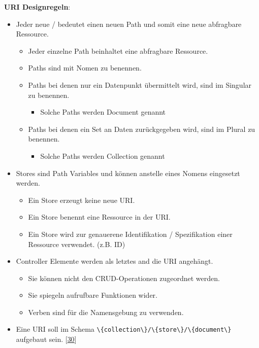 \documentclass[
    headings=optiontotocandhead,%
    twoside,
    numbers=noenddot,%
    12pt, %
    titlepage, %
    parskip=full, %
    listof=leveldown, 
    numbers=noenddot, %
    a4paper,DIV=14,
    BCOR=15mm,
]{scrbook}
\newcommand{\passthrough}[1]{#1}
\providecommand{\tightlist}{%
  \setlength{\itemsep}{0pt}\setlength{\parskip}{0pt}}
\begin{document}
\textbf{URI Designregeln}:

\begin{itemize}
\tightlist
\item
  Jeder neue / bedeutet einen neuen Path und somit eine neue abfragbare
  Ressource.

  \begin{itemize}
  \tightlist
  \item
    Jeder einzelne Path beinhaltet eine abfragbare Ressource.
  \item
    Paths sind mit Nomen zu benennen.
  \item
    Paths bei denen nur ein Datenpunkt übermittelt wird, sind im
    Singular zu benennen.

    \begin{itemize}
    \tightlist
    \item
      Solche Paths werden Document genannt
    \end{itemize}
  \item
    Paths bei denen ein Set an Daten zurückgegeben wird, sind im Plural
    zu benennen.

    \begin{itemize}
    \tightlist
    \item
      Solche Paths werden Collection genannt
    \end{itemize}
  \end{itemize}
\item
  Stores sind Path Variables und können anstelle eines Nomens eingesetzt
  werden.

  \begin{itemize}
  \tightlist
  \item
    Ein Store erzeugt keine neue URI.
  \item
    Ein Store benennt eine Ressource in der URI.
  \item
    Ein Store wird zur genauerene Identifikation / Spezifikation einer
    Ressource verwendet. (z.B. ID)
  \end{itemize}
\item
  Controller Elemente werden als letztes and die URI angehängt.

  \begin{itemize}
  \tightlist
  \item
    Sie können nicht den CRUD-Operationen zugeordnet werden.
  \item
    Sie spiegeln aufrufbare Funktionen wider.
  \item
    Verben sind für die Namensgebung zu verwenden.
  \end{itemize}
\item
  Eine URI soll im Schema
  \passthrough{\lstinline!\{collection\}/\{store\}/\{document\}!}
  aufgebaut sein.
  {[}\protect\hyperlink{ref-REST-API-Design-Rulebook}{30}{]}
\end{itemize}
\end{document}
